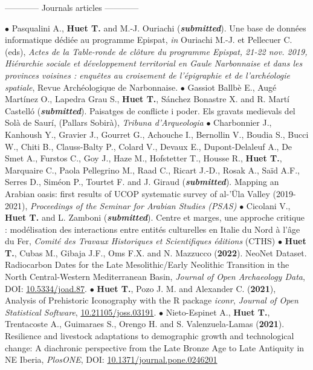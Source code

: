 \documentclass{article}
\begin{document}
\begin{center}------------ Journals articles ------------\end{center}
$\bullet$ Pasqualini A., \textbf{Huet T.} and M.-J. Ouriachi (\textit{\textbf{submitted}}). Une base de données informatique dédiée au programme Epispat, \textit{in} Ouriachi M.-J. et Pellecuer C. (eds), \textit{Actes de la Table-ronde de cl\^{o}ture du programme Epispat, 21-22 nov. 2019, Hi\'{e}rarchie sociale et d\'{e}veloppement territorial en Gaule Narbonnaise et dans les provinces voisines : enqu\^{e}tes au croisement de l'\'{e}pigraphie et de l'arch\'{e}ologie spatiale}, Revue Arch\'{e}ologique de Narbonnaise.
\smallbreak
$\bullet$ Gassiot Ballbè E., Augé Martínez O., Lapedra Grau S., \textbf{Huet T.}, Sánchez Bonastre X. and R. Martí Castelló (\textit{\textbf{submitted}}). Paisatges de conflicte i poder. Els gravats medievals del Solà de Saurí, (Pallars Sobirà), \textit{Tribuna d'Arqueologia}
\smallbreak
$\bullet$ Charbonnier J., Kanhoush Y., Gravier J., Gourret G., Achouche I., Bernollin V., Boudia S., Bucci W., Chiti B., Clauss-Balty P., Colard V., Devaux E., Dupont-Delaleuf A., De Smet A., Furstos C., Goy J., Haze M., Hofstetter T., Housse R., \textbf{Huet T.}, Marquaire C., Paola Pellegrino M., Raad C., Ricart J.-D., Rosak A., Saïd A.F., Serres D., Siméon P., Tourtet F. and J. Giraud (\textit{\textbf{submitted}}). Mapping an Arabian oasis: first results of UCOP systematic survey of al-'Ūla Valley
(2019-2021), \textit{Proceedings of the Seminar for Arabian Studies (PSAS)}
\smallbreak
$\bullet$ Cicolani V., \textbf{Huet T.} and L. Zamboni (\textit{\textbf{submitted}}). Centre et marges, une approche critique : modélisation des interactions entre entités culturelles en Italie du Nord à l'âge du Fer, \textit{Comit\'{e} des Travaux Historiques et Scientifiques \'{e}ditions} (CTHS)
\smallbreak
$\bullet$ \textbf{Huet T.}, Cubas M., Gibaja J.F., Oms F.X. and N. Mazzucco (\textbf{2022}). NeoNet Dataset. Radiocarbon Dates for the Late Mesolithic/Early Neolithic Transition in the North Central-Western Mediterranean Basin, \textit{Journal of Open Archaeology Data}, DOI: \href{http://doi.org/10.5334/joad.87}{10.5334/joad.87}.
\smallbreak
$\bullet$ \textbf{Huet T.}, Pozo J. M. and Alexander C. (\textbf{2021}), Analysis of Prehistoric Iconography with the R package \textit{iconr}, \textit{Journal of Open Statistical Software}, \href{https://joss.theoj.org/papers/10.21105/joss.03191}{10.21105/joss.03191}.
\smallbreak
$\bullet$ Nieto-Espinet A., \textbf{Huet T.}, Trentacoste A., Guimaraes S., Orengo H. and S. Valenzuela-Lamas (\textbf{2021}). Resilience and livestock adaptations to demographic growth and technological change: A diachronic perspective from the Late Bronze Age to Late Antiquity in NE Iberia, \textit{PlosONE}, DOI: \href{https://doi.org/10.1371/journal.pone.0246201}{10.1371/journal.pone.0246201}
\end{document}
